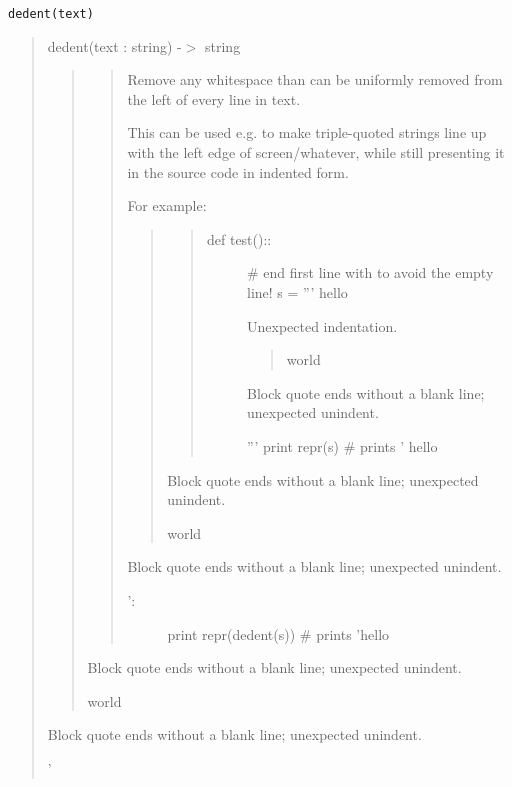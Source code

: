 \documentclass[10pt,english]{article}
\begin{document}
\texttt{dedent(text)}
\begin{quote}

dedent(text : string) -{$>$} string
\begin{quote}
\begin{quote}

Remove any whitespace than can be uniformly removed from the left
of every line in text.

This can be used e.g. to make triple-quoted strings line up with
the left edge of screen/whatever, while still presenting it in the
source code in indented form.

For example:
\begin{quote}
\begin{quote}
\begin{description}
\item[def test()::]

{\#} end first line with to avoid the empty line!
s = '''            hello

Unexpected indentation.

\begin{quote}

world
\end{quote}

Block quote ends without a blank line; unexpected unindent.


'''
print repr(s)          {\#} prints '    hello

\end{description}
\end{quote}

Block quote ends without a blank line; unexpected unindent.


world
\end{quote}

Block quote ends without a blank line; unexpected unindent.

\begin{description}
\item[':]

print repr(dedent(s))  {\#} prints 'hello

\end{description}
\end{quote}

Block quote ends without a blank line; unexpected unindent.


world
\end{quote}

Block quote ends without a blank line; unexpected unindent.


'
\end{quote}
\end{document}
